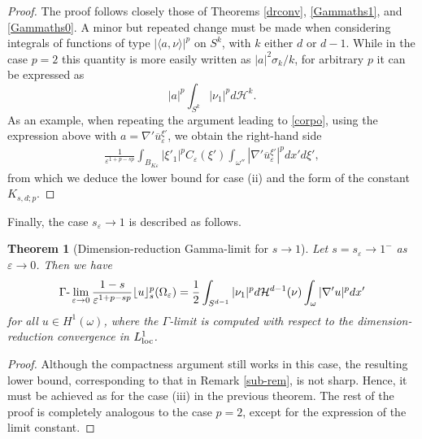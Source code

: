 \documentclass[11pt]{article}
\newtheorem{theorem}[definition]{Theorem}
\def\e{\varepsilon}
\begin{document}
\begin{proof} The proof follows closely those of Theorems  
\ref{drconv}, \ref{Gammaths1}, and \ref{Gammaths0}. A minor but repeated change must be made when considering integrals of functions of type $|\langle a,\nu\rangle|^p$ on $S^k$, with $k$ either $d$ or $d-1$. While in the case $p=2$ this quantity is more easily written as $|a|^2\sigma_k/k$, for arbitrary $p$ it can be expressed as 
$$
|a|^p\int_{S^k}|\nu_1|^pd\mathcal H^k.
$$
As an example, when repeating the argument leading to \eqref{corpo},
using the expression above with $a=\nabla'\overline u_\e^{\xi'}$, we obtain the right-hand side 
\begin{eqnarray}\label{corpo-p}
\frac{1}{\e^{1+p-sp}}\int_{B_{K\e}}|\xi'_1|^p C_\e(\xi') \int_{\omega''}
|\nabla'\overline u_\e^{\xi'}|^p dx' d\xi',
\end{eqnarray}
from which we deduce the lower bound for case (ii) and the form of the constant $K_{s,d;p}$.
\end{proof}


Finally, the case $s_\e\to 1$ is described as follows.

\begin{theorem}[Dimension-reduction Gamma-limit for $s\to 1$]\label{Gammath-p} Let $s=s_\e\to 1^-$ as $\e\to 0$. 
Then we have
$$
\Gamma\hbox{-}\lim_{\e\to 0} \frac{1-s}{\e^{1+p-sp}}\lfloor u\rfloor_s^p(\Omega_\e)= \frac12\int_{S^{d-1}}|\nu_1|^pd\mathcal H^{d-1}(\nu)\int_\omega |\nabla'u|^pdx'
$$
for all $u\in H^1(\omega)$, where the $\Gamma$-limit is computed with respect to the dimension-reduction convergence in $L^1_{\rm loc}$.
\end{theorem}

\begin{proof}
 Although the compactness argument still works in this case, the resulting lower bound, corresponding to that in Remark \ref{sub-rem}, is not sharp. Hence, it must be achieved as for the case (iii) in the previous theorem. The rest of the proof is completely analogous to the case $p=2$, except for the expression of the limit constant.
\end{proof}

\end{document}
